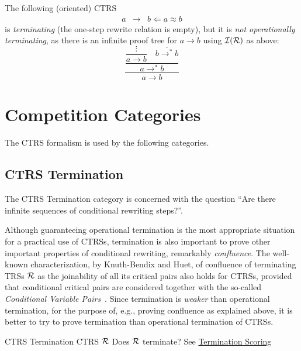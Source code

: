 \begin{example}
The following (oriented) CTRS
\begin{eqnarray}
a & \to & b \Leftarrow a \approx b
\end{eqnarray}
is \emph{terminating} (the one-step rewrite relation is empty), but it is \emph{not operationally terminating}, as there is an infinite proof tree for $a\to b$ using ${\cal I}({\cal R})$ as above:
\[
\dfrac{\dfrac{\dfrac{\vdots}{a \to b} \quad \overline{b \to^* b}}{a \to^{*} b}}{a \to b}
\]
\end{example}

\section{Competition Categories}

The CTRS formalism is used by the following categories.

\subsection{CTRS Termination}

The CTRS Termination category is concerned with the question 
``Are there infinite sequences of conditional rewriting steps?''.
%

\begin{motivation}
Although guaranteeing operational termination is the most appropriate situation for a practical use of CTRSs, termination is also important to prove other important properties of conditional rewriting, remarkably \emph{confluence}. 
%
The well-known characterization, by Knuth-Bendix and Huet, of confluence of terminating TRSs ${\cal R}$ as the joinability of all its critical pairs  also holds for CTRSs, provided that conditional critical pairs are considered together with the so-called \emph{Conditional Variable Pairs}~\cite{lucas2024LocalConfluenceConditional}.
%
Since termination is \emph{weaker} than operational termination, for the purpose of, e.g., proving confluence as explained above, it is better to try to prove termination than operational termination of CTRSs.
\end{motivation}

\begin{formalproblem}
  {CTRS Termination}
  {CTRS $\mathcal{R}$}
  {Does $\mathcal{R}$ terminate?}
  {See \hyperref[scoring_termination]{Termination Scoring}}
\end{formalproblem}

